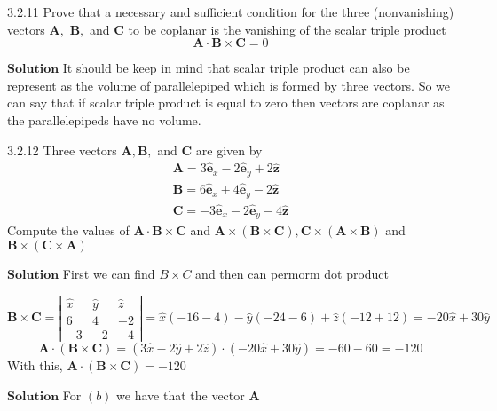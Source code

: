 $$$$

\begin{mybox}{3.2.11}
Prove that a necessary and sufficient condition for the three (nonvanishing) vectors $\mathbf{A},$ $\mathbf{B},$ and $\mathbf{C}$ to be coplanar is the vanishing of the scalar triple product
$$
\mathbf{A} \cdot \mathbf{B} \times \mathbf{C}=0
$$
\end{mybox}
$\boxed{\textbf{Solution}}$ It should be keep in mind that scalar triple product can also be represent as the volume of
parallelepiped which is formed by three vectors. So we can say that if scalar triple product is equal to zero then vectors are coplanar as the parallelepipeds have no volume.

\newpage



\begin{mybox}{3.2.12}
Three vectors $\mathbf{A}, \mathbf{B},$ and $\mathbf{C}$ are given by
$$
\begin{array}{l}{\mathbf{A}=3 \hat{\mathbf{e}}_{x}-2 \hat{\mathbf{e}}_{y}+2 \hat{\mathbf{z}}} \\ {\mathbf{B}=6 \hat{\mathbf{e}}_{x}+4 \hat{\mathbf{e}}_{y}-2 \hat{\mathbf{z}}} \\ {\mathbf{C}=-3 \hat{\mathbf{e}}_{x}-2 \hat{\mathbf{e}}_{y}-4 \hat{\mathbf{z}}}\end{array}
$$
Compute the values of $\mathbf{A} \cdot \mathbf{B} \times \mathbf{C}$ and $\mathbf{A} \times(\mathbf{B} \times \mathbf{C}), \mathbf{C} \times(\mathbf{A} \times \mathbf{B})$ and $\mathbf{B} \times(\mathbf{C} \times \mathbf{A})$
\end{mybox}



$\boxed{\textbf{Solution}}$ First we can find $B\times C$ and then can permorm dot product

$$\mathbf{B} \times \mathbf{C}=\left|\begin{array}{ccc}\hat{x} & \hat{y} & \hat{z} \\ 6 & 4 & -2 \\ -3 & -2 & -4\end{array}\right|=\hat{x}(-16-4)-\hat{y}(-24-6)+\hat{z}(-12+12)=-20 \hat{x}+30 \hat{y}$$
$$\mathbf{A} \cdot(\mathbf{B} \times \mathbf{C})=(3 \hat{x}-2 \hat{y}+2 \hat{z}) \cdot(-20 \hat{x}+30 \hat{y})=-60-60=-120$$
With this, $\mathbf{A} \cdot (\mathbf{B} \times \mathbf{C})=-120$



$\boxed{\textbf{Solution}}$ For $(b)$ we have that the vector $\mathbf{A}$

